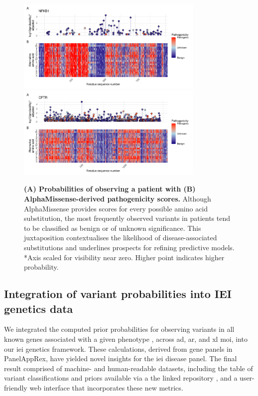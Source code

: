\begin{figure}[ht]
\begin{center}
    \includegraphics[width=0.8\textwidth]{../images/p_alphamissense_NFKB1.pdf}
    \includegraphics[width=0.8\textwidth]{../images/p_alphamissense_CFTR.pdf}
\end{center}
\caption{\textbf{(A) Probabilities of observing a patient with (B) AlphaMissense-derived pathogenicity scores.} Although AlphaMissense provides scores for every possible amino acid substitution, the most frequently observed variants in patients tend to be classified as benign or of unknown significance. This juxtaposition contextualises the likelihood of disease-associated substitutions and underlines prospects for refining predictive models. *Axis scaled for visibility near zero. Higher point indicates higher probability.}
 \label{fig:alphamissense}
\end{figure}


\FloatBarrier
\subsection{Integration of variant probabilities into IEI genetics data}
We integrated the computed prior probabilities for observing variants in all known genes associated with a given phenotype \cite{tangye_human_2022}, across \ac{ad}, \ac{ar}, and \ac{xl} \ac{moi}, into our \ac{iei} genetics framework. These calculations, derived from gene panels in PanelAppRex, have yielded novel insights for the \ac{iei} disease panel. The final result comprised of machine- and human-readable datasets, including the table of variant classifications and priors available via a the linked repository \cite{lawless_2025_15111584}, and a user-friendly web interface that incorporates these new metrics.

